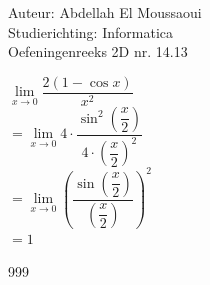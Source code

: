 \documentclass[a4paper]{article}
\begin{document}
  
\noindent \large Auteur: Abdellah El Moussaoui \\
\noindent \large Studierichting: Informatica\\
\noindent \large Oefeningenreeks 2D nr. 14.13\\

\medskip

\normalsize


$\lim\limits_{x\to0} \dfrac{2\left(1-\cos x\right)}{x^2}$\\


$ = \lim\limits_{x\to0} 4\cdot\dfrac{\sin^2\left(\dfrac{x}{2}\right)}{4\cdot\left(\dfrac{x}{2}\right)^2}$\\

$ = \lim\limits_{x\to0} \left(\dfrac{\sin \left(\dfrac{x}{2}\right)}{\left(\dfrac{x}{2}\right)}\right)^2$\\

$ = 1$\\


\begin{thebibliography}{999}
\end{thebibliography}
\end{document}
